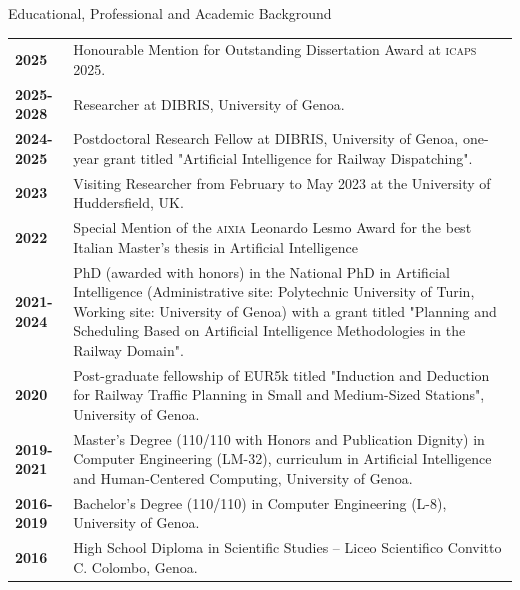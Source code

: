 \documentclass{resume} %
\begin{document}

\begin{rSection}{Educational, Professional and Academic Background}

\begin{tabularx}{0.95\textwidth} {lp{14cm}}
	\textbf{2025} & Honourable Mention for Outstanding Dissertation Award at \textsc{icaps} 2025.\\
 \textbf{2025-2028} & Researcher at DIBRIS, University of Genoa.  \\
 \textbf{2024-2025} & Postdoctoral Research Fellow at DIBRIS, University of Genoa, one-year grant titled "Artificial Intelligence for Railway Dispatching".  \\
 \textbf{2023}  & Visiting Researcher from February to May 2023 at the University of Huddersfield, UK.\\
  \textbf{2022}  & Special Mention of the \textsc{aixia} Leonardo Lesmo Award for the best Italian Master's thesis in Artificial Intelligence\\
 \textbf{2021-2024}  & PhD (awarded with honors) in the National PhD in Artificial Intelligence (Administrative site: Polytechnic University of Turin, Working site: University of Genoa) with a grant titled "Planning and Scheduling Based on Artificial Intelligence Methodologies in the Railway Domain".\\
 \textbf{2020} & Post-graduate fellowship of EUR5k titled "Induction and Deduction for Railway Traffic Planning in Small and Medium-Sized Stations", University of Genoa. \\
 \textbf{2019-2021}  & Master’s Degree (110/110 with Honors and Publication Dignity) in Computer Engineering (LM-32), curriculum in Artificial Intelligence and Human-Centered Computing, University of Genoa.  \\
 \textbf{2016-2019}  & Bachelor’s Degree (110/110) in Computer Engineering (L-8), University of Genoa. \\
 \textbf{2016}  & High School Diploma in Scientific Studies – Liceo Scientifico Convitto C. Colombo, Genoa. 
\end{tabularx}
\end{rSection}
\end{document}
